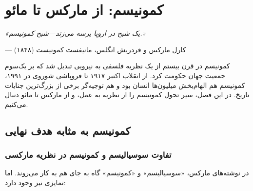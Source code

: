 
\chapter{کمونیسم: از مارکس تا مائو}
\label{ch:communism}

\begin{flushright}
\textit{«یک شبح در اروپا پرسه می‌زند—شبح کمونیسم.»}

— کارل مارکس و فردریش انگلس، مانیفست کمونیست (۱۸۴۸)
\end{flushright}


\lettrine[lines=3, lraise=0.1, nindent=0.5em]{\textcolor{LeftRedDark}{ک}}{مونیسم} 
در قرن بیستم از یک نظریه فلسفی به نیرویی تبدیل شد که بر یک‌سوم جمعیت جهان حکومت کرد. از انقلاب اکتبر ۱۹۱۷ تا فروپاشی شوروی در ۱۹۹۱، کمونیسم هم الهام‌بخش میلیون‌ها انسان بود و هم توجیه‌گر برخی از بزرگ‌ترین جنایات تاریخ. در این فصل، سیر تحول کمونیسم را از نظریه به عمل، و از مارکس تا مائو دنبال می‌کنیم.

\section{کمونیسم به مثابه هدف نهایی}

\subsection{تفاوت سوسیالیسم و کمونیسم در نظریه مارکسی}

در نوشته‌های مارکس، «سوسیالیسم» و «کمونیسم» گاه به جای هم به کار می‌روند. اما تمایزی نیز وجود دارد:

